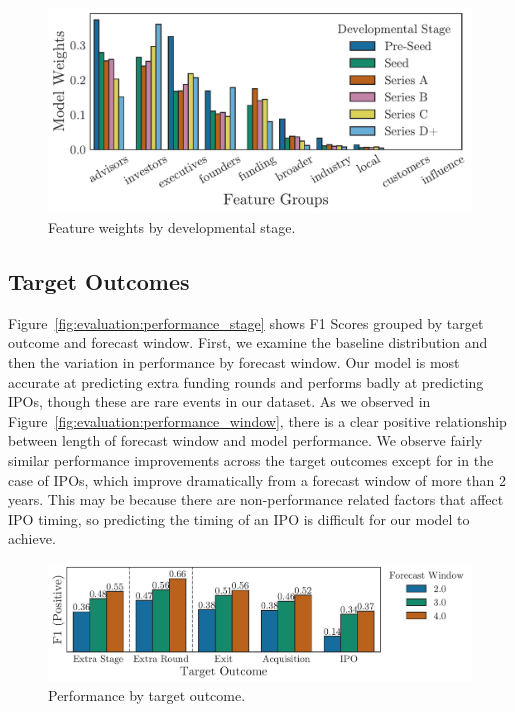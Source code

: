 ﻿\documentclass[../thesis/thesis.tex]{subfiles}
\begin{document}
\begin{figure}[!htb]
    \centering
    \includegraphics[width=\textwidth]{../figures/evaluation/features_stage}
    \caption[Feature weights by developmental stage]{Feature weights by developmental stage.}
    \label{fig:evaluation:features_stage}
\end{figure}

\subsection{Target Outcomes}


Figure~\ref{fig:evaluation:performance_stage} shows F1 Scores grouped by target outcome and forecast window. First, we examine the baseline distribution and then the variation in performance by forecast window. Our model is most accurate at predicting extra funding rounds and performs badly at predicting IPOs, though these are rare events in our dataset. As we observed in Figure~\ref{fig:evaluation:performance_window}, there is a clear positive relationship between length of forecast window and model performance. We observe fairly similar performance improvements across the target outcomes except for in the case of IPOs, which improve dramatically from a forecast window of more than 2 years. This may be because there are non-performance related factors that affect IPO timing, so predicting the timing of an IPO is difficult for our model to achieve.

\begin{figure}[!htb]
    \centering
    \includegraphics[width=\textwidth]{../figures/evaluation/performance_outcome}
    \caption[Performance by target outcome]{Performance by target outcome.}
    \label{fig:evaluation:f1_predictive_outcome}
\end{figure}
\end{document}

